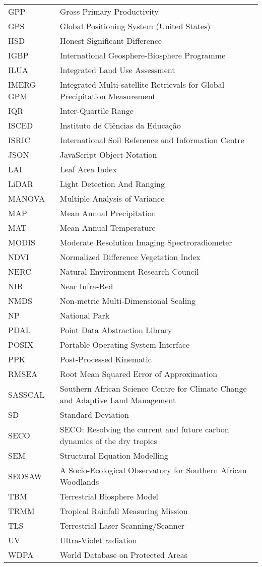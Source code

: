 \begin{longtable}{lp{11cm}}
	GPP & Gross Primary Productivity \\
	GPS & Global Positioning System (United States) \\
	HSD & Honest Significant Difference \\
	IGBP & International Geosphere-Biosphere Programme \\
	ILUA & Integrated Land Use Assessment \\
	IMERG GPM & Integrated Multi-satellite Retrievals for Global Precipitation Measurement \\
	IQR & Inter-Quartile Range \\
	ISCED & Instituto de Ci\^{e}ncias da Educa\c{c}\~{a}o  \\
	ISRIC & International Soil Reference and Information Centre \\
	JSON & JavaScript Object Notation \\
	LAI & Leaf Area Index \\
	LiDAR & Light Detection And Ranging \\
	MANOVA & Multiple Analysis of Variance \\
	MAP & Mean Annual Precipitation \\
	MAT & Mean Annual Temperature \\
	MODIS & Moderate Resolution Imaging Spectroradiometer \\
	NDVI & Normalized Difference Vegetation Index \\
	NERC & Natural Environment Research Council \\
	NIR & Near Infra-Red \\
	NMDS & Non-metric Multi-Dimensional Scaling \\
	NP & National Park \\
	PDAL & Point Data Abstraction Library \\
	POSIX & Portable Operating System Interface \\
	PPK & Post-Processed Kinematic \\
	RMSEA & Root Mean Squared Error of Approximation \\
	SASSCAL & Southern African Science Centre for Climate Change and Adaptive Land Management \\
	SD & Standard Deviation \\
	SECO & SECO: Resolving the current and future carbon dynamics of the dry tropics \\ 
	SEM & Structural Equation Modelling \\
	SEOSAW & A Socio-Ecological Observatory for Southern African Woodlands \\
	TBM & Terrestrial Biosphere Model \\
	TRMM & Tropical Rainfall Measuring Mission \\
	TLS & Terrestrial Laser Scanning/Scanner \\
	UV & Ultra-Violet radiation \\
	WDPA & World Database on Protected Areas \\
\end{longtable}
